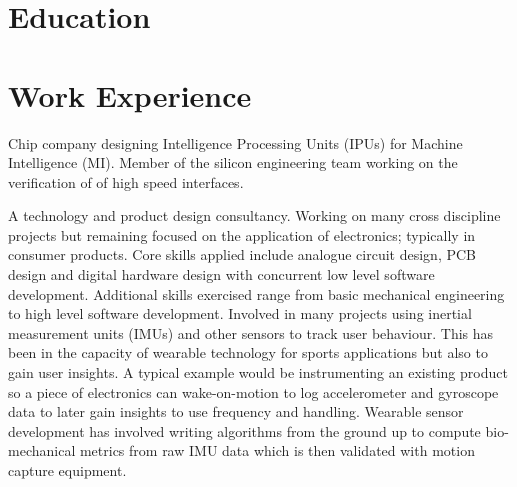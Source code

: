 \documentclass[11pt,a4paper,sans]{moderncv}
\begin{document}
\makecvtitle

\section{Education}


\section{Work Experience}
      { Chip company designing Intelligence Processing Units (IPUs) for Machine Intelligence (MI). 
        Member of the silicon engineering team working on the verification of of high speed interfaces.
        }
        {}

      {  A technology and product design consultancy. 
         Working on many cross discipline projects but remaining focused on the application of electronics; typically in consumer products.
         Core skills applied include analogue circuit design, PCB design and digital hardware design with concurrent low level software development. 
         Additional skills exercised range from basic mechanical engineering to high level software development.       
        Involved in many projects using inertial measurement units (IMUs) and other sensors to track user behaviour. This has been in the capacity of wearable technology for sports applications but also to gain user insights. A typical example would be instrumenting an existing product so a piece of electronics can wake-on-motion to log accelerometer and gyroscope data to later gain insights to use frequency and handling. Wearable sensor development has involved writing algorithms from the ground up to compute bio-mechanical metrics from raw IMU data which is then validated with motion capture equipment.
      }
\end{document}
